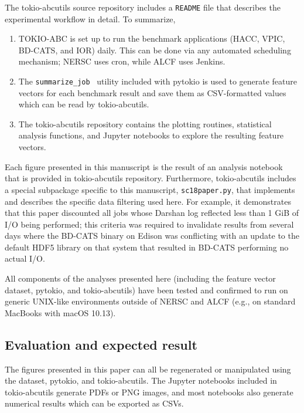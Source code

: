 The tokio-abcutils source repository includes a \texttt{README} file that describes the experimental workflow in detail.
To summarize,

\begin{enumerate}[leftmargin=*]

\item TOKIO-ABC is set up to run the benchmark applications (HACC, VPIC, BD-CATS, and IOR) daily.
This can be done via any automated scheduling mechanism; NERSC uses cron, while ALCF uses Jenkins.

\item The \texttt{summarize\_job}~\cite{Lockwood2018tokio} utility included with pytokio is used to generate feature vectors for each benchmark result and save them as CSV-formatted values which can be read by tokio-abcutils.

\item The tokio-abcutils repository contains the plotting routines, statistical analysis functions, and Jupyter notebooks to explore the resulting feature vectors.

\end{enumerate}

Each figure presented in this manuscript is the result of an analysis notebook that is provided in tokio-abcutils repository.
Furthermore, tokio-abcutils includes a special subpackage specific to this manuscript, \texttt{sc18paper.py}, that implements and describes the specific data filtering used here.
For example, it demonstrates that this paper discounted all jobs whose Darshan log reflected less than 1 GiB of I/O being performed; this criteria was required to invalidate results from several days where the BD-CATS binary on Edison was conflicting with an update to the default HDF5 library on that system that resulted in BD-CATS performing no actual I/O.

All components of the analyses presented here (including the feature vector dataset, pytokio, and tokio-abcutils) have been tested and confirmed to run on generic UNIX-like environments outside of NERSC and ALCF (e.g., on standard MacBooks with macOS 10.13).

\subsection{Evaluation and expected result}

The figures presented in this paper can all be regenerated or manipulated using the dataset, pytokio, and tokio-abcutils.
The Jupyter notebooks included in tokio-abcutils generate PDFs or PNG images, and most notebooks also generate numerical results which can be exported as CSVs.


